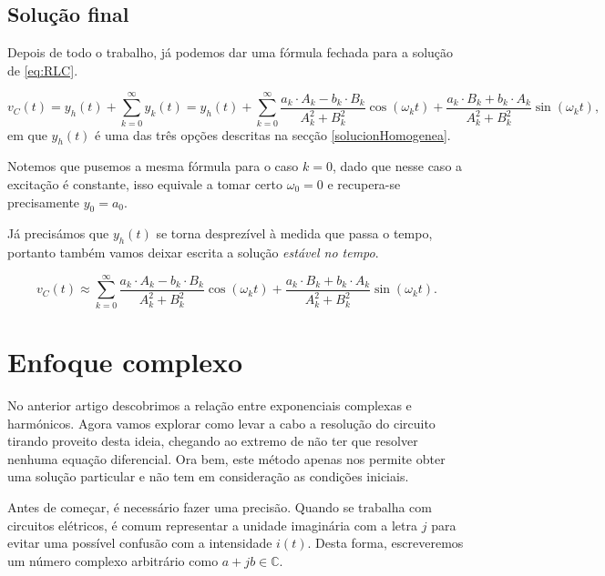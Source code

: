 \subsection{Solução final}
Depois de todo o trabalho, já podemos dar uma fórmula fechada para a solução de \eqref{eq:RLC}.
\begin{mybox} \vspace{-4mm}
  \begin{equation}
    \label{eq:SolucionRLC}
    v_C(t) = y_h(t) + \sum _{k=0}^{\infty} y_k (t) = y_h(t) +  \sum _{k=0}^{\infty}  \frac{a_k\cdot A_k-b_k\cdot B_k}{A_k^2+B_k^2}\cos(\omega_kt) + \frac{a_k\cdot B_k + b_k\cdot A_k}{A_k^2+B_k^2}\sin(\omega_kt),
  \end{equation}
  em que $y_h(t)$ é uma das três opções descritas na secção \ref{solucionHomogenea}.
\end{mybox}

Notemos que pusemos a mesma fórmula para o caso $k=0$, dado que nesse caso a excitação é constante, isso equivale a tomar certo $\omega_0=0$ e recupera-se precisamente $y_0=a_0$.

Já precisámos que $y_h(t)$ se torna desprezível à medida que passa o tempo, portanto também vamos deixar escrita a solução \textit{estável no tempo}.

\begin{mybox} \vspace{-4mm}
  \begin{equation}
    \label{eq:SolucionRLC2}
    v_C(t) \approx \sum _{k=0}^{\infty}  \frac{a_k\cdot A_k-b_k\cdot B_k}{A_k^2+B_k^2}\cos(\omega_kt) + \frac{a_k\cdot B_k + b_k\cdot A_k}{A_k^2+B_k^2}\sin(\omega_kt).
  \end{equation}
\end{mybox}


\section{Enfoque complexo}

No anterior artigo descobrimos a relação entre exponenciais complexas e harmónicos. Agora vamos explorar como levar a cabo a resolução do circuito tirando proveito desta ideia, chegando ao extremo de não ter que resolver nenhuma equação diferencial. Ora bem, este método apenas nos permite obter uma solução particular e não tem em consideração as condições iniciais.

Antes de começar, é necessário fazer uma precisão. Quando se trabalha com circuitos elétricos, é comum representar a unidade imaginária com a letra $j$ para evitar uma possível confusão com a intensidade $i(t)$. Desta forma, escreveremos um número complexo arbitrário como $a+jb\in\mathbb{C}$.

